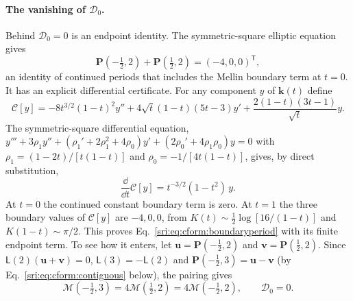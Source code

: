 \paragraph{The vanishing of $\mathcal D_0$.} Behind $\mathcal D_0=0$ is an endpoint identity. The symmetric-square
elliptic equation gives
\begin{equation}
 \mathbf P(-\tfrac12,2)+\mathbf P(\tfrac12,2)=(-4,0,0)^{\mathsf T},
 \label{sri:eq:cform:boundaryperiod}
\end{equation}
an identity of continued periods that includes the Mellin boundary term at $t=0$. It has an explicit differential
certificate. For any component $y$ of $\mathbf k(t)$ define
\begin{equation}
 \mathcal C[y]=-8t^{3/2}(1-t)^2y''+4\sqrt t(1-t)(5t-3)y'+\frac{2(1-t)(3t-1)}{\sqrt t}y.
\end{equation}
The symmetric-square differential equation,
$y'''+3\rho_1y''+(\rho_1'+2\rho_1^2+4\rho_0)y'+(2\rho_0'+4\rho_1\rho_0)y=0$ with $\rho_1=(1-2t)/[t(1-t)]$ and
$\rho_0=-1/[4t(1-t)]$, gives, by direct substitution,
\begin{equation}
 \frac{\dd}{\dd t}\mathcal C[y]=t^{-3/2}(1-t^2)\,y.
\end{equation}
At $t=0$ the continued constant boundary term is zero. At $t=1$ the three boundary values of $\mathcal C[y]$ are
$-4,0,0$, from $K(t)\sim\frac12\log[16/(1-t)]$ and $K(1-t)\sim\pi/2$. This proves Eq.~\eqref{sri:eq:cform:boundaryperiod}
with its finite endpoint term. To see how it enters, let $\mathbf u=\mathbf P(-\frac12,2)$ and
$\mathbf v=\mathbf P(\frac12,2)$. Since $\mathsf L(2)(\mathbf u+\mathbf v)=0$, $\mathsf L(3)=-\mathsf L(2)$ and
$\mathbf P(-\frac12,3)=\mathbf u-\mathbf v$ (by Eq.~\eqref{sri:eq:cform:contiguous} below), the pairing gives
\begin{equation}
 \mathcal M(-\tfrac12,3)=4\mathcal M(\tfrac12,2)=4\mathcal M(-\tfrac12,2),\qquad\mathcal D_0=0.
\end{equation}

